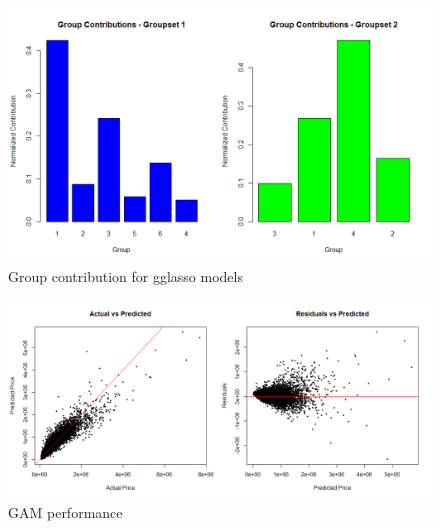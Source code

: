 \documentclass[a4paper, 11pt]{article}
\begin{document}
\begin{figure}[H]
\includegraphics[scale=0.5]{gglassocontrib}
\centering
\caption{Group contribution for gglasso models}
\label{fig:gglassocontrib}
\end{figure}


\begin{figure}[H]
\includegraphics[scale=0.4]{gamperf}
\centering
\caption{GAM performance}
\label{fig:gamperf}
\end{figure}
\end{document}
